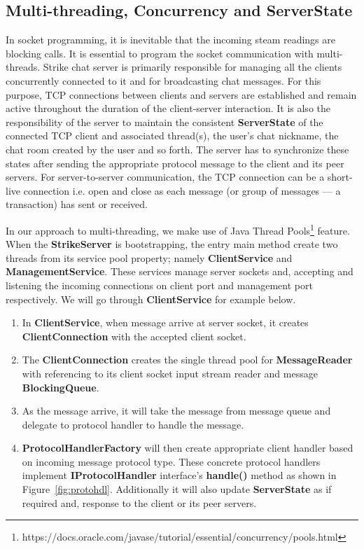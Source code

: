 \documentclass[dareport.tex]{subfiles}
\begin{document}
\subsection{Multi-threading, Concurrency and ServerState}
In socket programming, it is inevitable that the incoming steam readings are blocking calls. It is essential to program the socket communication with multi-threads. Strike chat server is primarily responsible for managing all the clients concurrently connected to it and for broadcasting chat messages. For this purpose, TCP connections between clients and servers are established and remain active throughout the duration of the client-server interaction. It is also the responsibility of the server to maintain the consistent \textbf{ServerState} of the connected TCP client and associated thread(s), the user's chat nickname, the chat room created by the user and so forth. The server has to synchronize these states after sending the appropriate protocol message to the client and its peer servers. For server-to-server communication, the TCP connection can be a short-live connection i.e. open and close as each message (or group of messages --- a transaction) has sent or received.

In our approach to multi-threading, we make use of Java Thread Pools\footnote{https://docs.oracle.com/javase/tutorial/essential/concurrency/pools.html} feature. When the \textbf{StrikeServer} is bootstrapping, the entry main method create two threads from its service pool property; namely \textbf{ClientService} and \textbf{ManagementService}. These services manage server sockets and, accepting and listening the incoming connections on client port and management port respectively. We will go through \textbf{ClientService} for example below.

\begin{enumerate}[leftmargin=*]

\item In \textbf{ClientService}, when message arrive at server socket, it creates \textbf{ClientConnection} with the accepted client socket.

\item The \textbf{ClientConnection} creates the single thread pool for \textbf{MessageReader} with referencing to its client socket input stream reader and message \textbf{BlockingQueue}.

\item As the message arrive, it will take the message from message queue and delegate to protocol handler to handle the message.

\item \textbf{ProtocolHandlerFactory} will then create appropriate client handler based on incoming message protocol type. These concrete protocol handlers implement \textbf{IProtocolHandler} interface's \textbf{handle()} method as shown in Figure~\ref{fig:protohdl}. Additionally it will also update \textbf{ServerState} as if required and, response to the client or its peer servers.

\end{enumerate}
\end{document}
